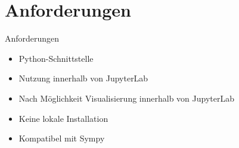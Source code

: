 \documentclass{beamer}
\begin{document}
\section{Anforderungen}
\begin{frame}{Anforderungen}
  \begin{itemize}
    \setlength{\itemsep}{1em}
    \item Python-Schnittstelle
    \item Nutzung innerhalb von JupyterLab
    \item Nach Möglichkeit Visualisierung innerhalb von JupyterLab
    \item Keine lokale Installation
    \item Kompatibel mit Sympy
  \end{itemize}
\end{frame}





%
%
%
%
%
%
\end{document}
